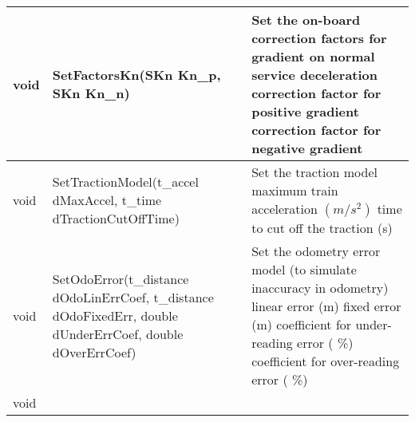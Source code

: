 \documentclass{template/openetcs_article}
\begin{document}
\begin{longtable}{|l|l|l|}
	\hline
		\begin{minipage}[t]{0.10\linewidth} void \end{minipage} 
	&	\begin{minipage}[t]{0.50\linewidth} SetFactorsKn(SKn Kn\_p, SKn Kn\_n) \end{minipage} 
	&	\begin{minipage}[t]{0.45\linewidth} Set the on-board correction factors for gradient on normal service deceleration
	\newline [in] correction factor for positive gradient
	\newline [in] correction factor for negative gradient \end{minipage} \\
	\hline
		\begin{minipage}[t]{0.10\linewidth} void \end{minipage} 
	&	\begin{minipage}[t]{0.50\linewidth} SetTractionModel(t\_accel dMaxAccel, t\_time dTractionCutOffTime) \end{minipage} 
	&	\begin{minipage}[t]{0.45\linewidth} Set the traction model
	\newline [in] maximum train acceleration $(m/s^{2})$
	\newline [in] time to cut off the traction (s) \end{minipage} \\
	\hline
		\begin{minipage}[t]{0.10\linewidth} void \end{minipage} 
	&	\begin{minipage}[t]{0.50\linewidth} SetOdoError(t\_distance dOdoLinErrCoef, t\_distance dOdoFixedErr, double dUnderErrCoef, double dOverErrCoef) \end{minipage} 
	&	\begin{minipage}[t]{0.45\linewidth} Set the odometry error model (to simulate inaccuracy in odometry)
	\newline [in] linear error (m)
	\newline [in] fixed error (m)
	\newline [in] coefficient for under-reading error ( \%) 
	\newline [in] coefficient for over-reading error ( \%) \end{minipage} \\
	\hline
		\begin{minipage}[t]{0.10\linewidth} void \end{minipage} 

\end{longtable}
\end{document}
